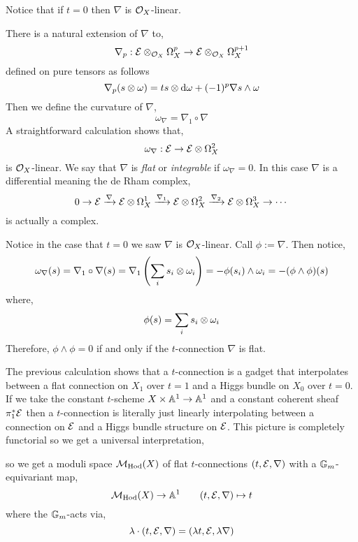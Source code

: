 \documentclass[12pt]{article}
\begin{document}
\begin{rmk}
Notice that if $t = 0$ then $\nabla$ is $\mathcal{O}_{X}$-linear.
\end{rmk}

\begin{defn}
There is a natural extension of $\nabla$ to,
\[ \nabla_p : \mathcal{E} \otimes_{\mathcal{O}_{X}} \Omega^p_X \to \mathcal{E} \otimes_{\mathcal{O}_{X}} \Omega^{p+1}_X \]
defined on pure tensors as follows
\[ \nabla_p(s \otimes \omega) = t s \otimes \mathrm{d}{\omega} + (-1)^p \nabla s \wedge \omega \]
Then we define the curvature of $\nabla$,
\[ \omega_{\nabla} = \nabla_1 \circ \nabla \]
A straightforward calculation shows that,
\[ \omega_{\nabla} : \mathcal{E} \to \mathcal{E} \otimes \Omega^2_X \]
is $\mathcal{O}_{X}$-linear. We say that $\nabla$ is \textit{flat} or \textit{integrable} if $\omega_{\nabla} = 0$. In this case $\nabla$ is a differential meaning the de Rham complex,
\[ 0 \to \mathcal{E} \xrightarrow{\nabla} \mathcal{E} \otimes \Omega^1_X \xrightarrow{\nabla_1} \mathcal{E} \otimes \Omega_X^2 \xrightarrow{\nabla_2} \mathcal{E} \otimes \Omega_X^3 \to \cdots \]
is actually a complex.
\end{defn}

\begin{rmk}
Notice in the case that $t = 0$ we saw $\nabla$ is $\mathcal{O}_{X}$-linear. Call $\phi := \nabla$. Then notice,
\[ \omega_{\nabla}(s) = \nabla_1 \circ \nabla(s) = \nabla_1 \left( \sum_i s_i \otimes \omega_i \right) = - \phi(s_i) \wedge \omega_i = - (\phi \wedge \phi)(s) \] 
where,
\[ \phi(s) = \sum_i s_i \otimes \omega_i \]
Therefore, $\phi \wedge \phi = 0$ if and only if the $t$-connection $\nabla$ is flat. 
\end{rmk}

The previous calculation shows that a $t$-connection is a gadget that interpolates between a flat connection on $X_1$ over $t = 1$ and a Higgs bundle on $X_0$ over $t = 0$. If we take the constant $t$-scheme $X \times \mathbb{A}^1 \to \mathbb{A}^1$ and a constant coherent sheaf $\pi_1^* \mathcal{E}$ then a $t$-connection is literally just linearly interpolating between a connection on $\mathcal{E}$ and a Higgs bundle structure on $\mathcal{E}$. This picture is completely functorial so we get a universal interpretation,
\begin{center}
\end{center}
so we get a moduli space $\mathcal{M}_{\mathrm{Hod}}(X)$ of flat $t$-connections $(t, \mathcal{E}, \nabla)$ with a $\mathbb{G}_m$-equivariant map,
\[ \mathcal{M}_{\text{Hod}}(X) \to \mathbb{A}^1 \quad \quad (t, \mathcal{E}, \nabla) \mapsto t \]
where the $\mathbb{G}_m$-acts via,
\[ \lambda \cdot (t, \mathcal{E}, \nabla) = (\lambda t, \mathcal{E}, \lambda \nabla) \]
\end{document}
